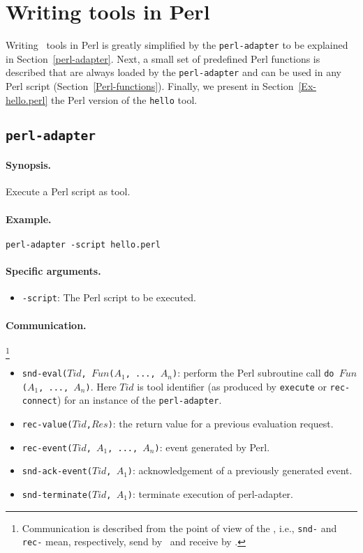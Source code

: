 
\section{\label{ToolsInPerl}Writing tools in Perl}

Writing \TB\ tools in Perl is greatly simplified by the {\tt perl-adapter}
to be explained in Section~\ref{perl-adapter}.
Next, a small set of predefined Perl functions is described that are
always loaded by the {\tt perl-adapter} and can be used in any Perl script
(Section~\ref{Perl-functions}).
Finally, we present in Section~\ref{Ex-hello.perl} the Perl version
of the {\tt hello} tool.

\subsection{\label{perl-adapter}{\tt perl-adapter}}

\paragraph{Synopsis.} Execute a Perl script as tool.

\paragraph{Example.} {\tt perl-adapter -script hello.perl}

\paragraph{Specific arguments.}
\begin{itemize}
\item {\tt -script}: The Perl script to be executed.
\end{itemize}

\paragraph{Communication.} \hspace{-0.3cm}\footnote{Communication is described
from the point of view of the \TB, i.e., {\tt snd-} and {\tt rec-}
mean, respectively, send by \TB\ and receive by \TB.}

\begin{itemize}
\item {\tt snd-eval($Tid$, $Fun$($A_1$, ..., $A_n$)}: perform the Perl subroutine call
{\tt do $Fun$($A_1$,  ..., $A_n$)}. Here $Tid$ is tool identifier 
(as produced by {\tt execute} or {\tt rec-connect}) for an instance of the {\tt perl-adapter}.
\item {\tt rec-value($Tid$,$Res$)}: the return value for a previous evaluation request.
\item {\tt rec-event($Tid$, $A_1$, ..., $A_n$)}: event generated by Perl.
\item {\tt snd-ack-event($Tid$, $A_1$)}: acknowledgement of
a previously generated event.
\item {\tt snd-terminate($Tid$, $A_1$)}: terminate execution of perl-adapter.
\end{itemize}

